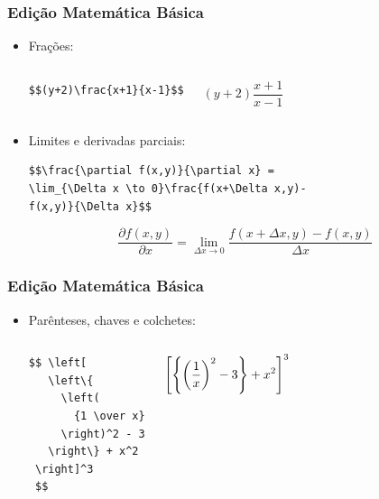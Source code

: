 \begin{frame}[fragile]
\frametitle{Edição Matemática Básica}

\begin{itemize}
	\item Frações:
	\begin{columns}
	\small
	 \verb|$$(y+2)\frac{x+1}{x-1}$$|
	\begin{framed}
	$$(y+2)\frac{x+1}{x-1}$$
	\end{framed}	 
	 \end{columns}
	
	\item Limites e derivadas parciais: {\small
	\begin{verbatim}
$$\frac{\partial f(x,y)}{\partial x} =
\lim_{\Delta x \to 0}\frac{f(x+\Delta x,y)-
f(x,y)}{\Delta x}$$
	\end{verbatim}
	\begin{framed}
	$$\frac{\partial f(x,y)}{\partial x} =
\lim_{\Delta x \to 0}\frac{f(x+\Delta x,y)-
f(x,y)}{\Delta x}$$
	\end{framed}	
	}

\end{itemize}
 
\end{frame}
\begin{frame}[fragile]
\frametitle{Edição Matemática Básica}

\begin{itemize}
  \item Parênteses, chaves e colchetes:
  	\begin{columns}
	\small
	\column{.5\textwidth}
	\begin{verbatim}	
$$ \left[
   \left\{
     \left(
       {1 \over x}
     \right)^2 - 3
   \right\} + x^2
 \right]^3
 $$
	\end{verbatim}
	\column{.5\textwidth}
	\begin{framed}
	$$ \left[
   \left\{
     \left(
       {1 \over x}
     \right)^2 - 3
   \right\} + x^2
 \right]^3
 $$
	\end{framed}
 \end{columns}
\end{itemize}
 
\end{frame}

